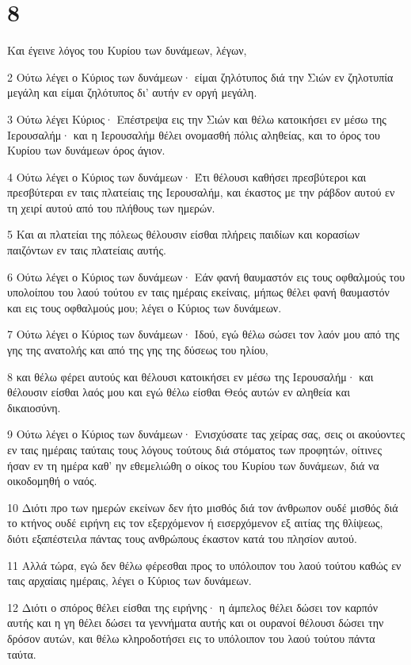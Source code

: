 \chapter{8}

\par Και έγεινε λόγος του Κυρίου των δυνάμεων, λέγων,
\par 2 Ούτω λέγει ο Κύριος των δυνάμεων· είμαι ζηλότυπος διά την Σιών εν ζηλοτυπία μεγάλη και είμαι ζηλότυπος δι' αυτήν εν οργή μεγάλη.
\par 3 Ούτω λέγει Κύριος· Επέστρεψα εις την Σιών και θέλω κατοικήσει εν μέσω της Ιερουσαλήμ· και η Ιερουσαλήμ θέλει ονομασθή πόλις αληθείας, και το όρος του Κυρίου των δυνάμεων όρος άγιον.
\par 4 Ούτω λέγει ο Κύριος των δυνάμεων· Έτι θέλουσι καθήσει πρεσβύτεροι και πρεσβύτεραι εν ταις πλατείαις της Ιερουσαλήμ, και έκαστος με την ράβδον αυτού εν τη χειρί αυτού από του πλήθους των ημερών.
\par 5 Και αι πλατείαι της πόλεως θέλουσιν είσθαι πλήρεις παιδίων και κορασίων παιζόντων εν ταις πλατείαις αυτής.
\par 6 Ούτω λέγει ο Κύριος των δυνάμεων· Εάν φανή θαυμαστόν εις τους οφθαλμούς του υπολοίπου του λαού τούτου εν ταις ημέραις εκείναις, μήπως θέλει φανή θαυμαστόν και εις τους οφθαλμούς μου; λέγει ο Κύριος των δυνάμεων.
\par 7 Ούτω λέγει ο Κύριος των δυνάμεων· Ιδού, εγώ θέλω σώσει τον λαόν μου από της γης της ανατολής και από της γης της δύσεως του ηλίου,
\par 8 και θέλω φέρει αυτούς και θέλουσι κατοικήσει εν μέσω της Ιερουσαλήμ· και θέλουσιν είσθαι λαός μου και εγώ θέλω είσθαι Θεός αυτών εν αληθεία και δικαιοσύνη.
\par 9 Ούτω λέγει ο Κύριος των δυνάμεων· Ενισχύσατε τας χείρας σας, σεις οι ακούοντες εν ταις ημέραις ταύταις τους λόγους τούτους διά στόματος των προφητών, οίτινες ήσαν εν τη ημέρα καθ' ην εθεμελιώθη ο οίκος του Κυρίου των δυνάμεων, διά να οικοδομηθή ο ναός.
\par 10 Διότι προ των ημερών εκείνων δεν ήτο μισθός διά τον άνθρωπον ουδέ μισθός διά το κτήνος ουδέ ειρήνη εις τον εξερχόμενον ή εισερχόμενον εξ αιτίας της θλίψεως, διότι εξαπέστειλα πάντας τους ανθρώπους έκαστον κατά του πλησίον αυτού.
\par 11 Αλλά τώρα, εγώ δεν θέλω φέρεσθαι προς το υπόλοιπον του λαού τούτου καθώς εν ταις αρχαίαις ημέραις, λέγει ο Κύριος των δυνάμεων.
\par 12 Διότι ο σπόρος θέλει είσθαι της ειρήνης· η άμπελος θέλει δώσει τον καρπόν αυτής και η γη θέλει δώσει τα γεννήματα αυτής και οι ουρανοί θέλουσι δώσει την δρόσον αυτών, και θέλω κληροδοτήσει εις το υπόλοιπον του λαού τούτου πάντα ταύτα.
